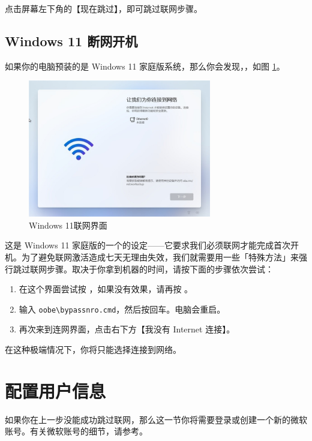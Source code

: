 点击屏幕左下角的【现在跳过】，即可跳过联网步骤。

\subsection{Windows 11 断网开机}

如果你的电脑预装的是 Windows 11 家庭版系统，那么你会发现，，如图 \ref{win-11-wifi}。

\begin{figure}[htb!]
  \centering
  \includegraphics[width=8cm]{assets/Wifi_Win_11.jpg}
  \caption{Windows 11联网界面}
  \label{win-11-wifi}
\end{figure}

这是 Windows 11 家庭版的一个的设定——它要求我们必须联网才能完成首次开机。为了避免联网激活造成七天无理由失效，我们就需要用一些「特殊方法」来强行跳过联网步骤。取决于你拿到机器的时间，请按下面的步骤依次尝试：

\begin{enumerate}
  \item 在这个界面尝试按 ，如果没有效果，请再按 。
  \item 输入 \verb|oobe\bypassnro.cmd|，然后按回车。电脑会重启。
  \item 再次来到连网界面，点击右下方【我没有 Internet 连接】。
\end{enumerate}

在这种极端情况下，你将只能选择连接到网络。

\section{配置用户信息}

\begin{note}
  如果你在上一步没能成功跳过联网，那么这一节你将需要登录或创建一个新的微软账号。有关微软账号的细节，请参考。
\end{note}

